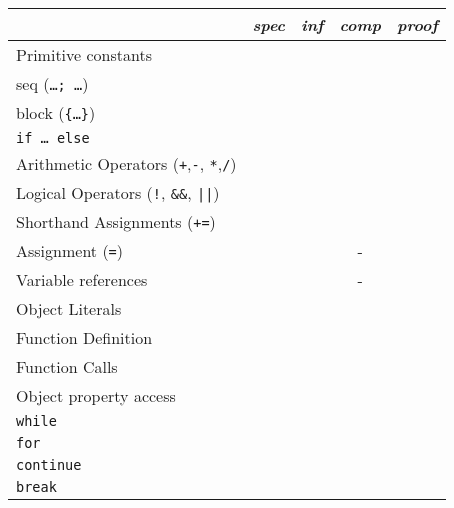 \documentclass{article}
\begin{document}
	\begin{table}[ht]
		\begin{tabular}{lcccc}
		                                  & \textit{spec} & \textit{inf} & \textit{comp} &  \textit{proof} \\ 
		\hline
		Primitive constants               & \checkmark{}  & \checkmark{} & \checkmark{}  &  \checkmark{}   \\
		seq (\texttt{\ldots; \ldots})     & \checkmark{}  & \checkmark{} & \checkmark{}  &  \checkmark{}   \\
		block (\texttt{\{\ldots\}})     & \checkmark{}  & \checkmark{} & \checkmark{}  &  \checkmark{}   \\
		\texttt{if \ldots~else}           & \checkmark{}  & \checkmark{} & \checkmark{}  &  \checkmark{}   \\
		Arithmetic Operators 
			(\texttt{+},\texttt{-},
			\texttt{*},\texttt{/})        & \checkmark{}  & \checkmark{} & \checkmark{}  &  \checkmark{}   \\
		Logical Operators 
			(\texttt{!}, \texttt{\&{}\&},
				 \texttt{||})             & \checkmark{}  & \checkmark{} & \checkmark{}  &  \checkmark{}   \\
		Shorthand Assignments 
			(\texttt{+=})                 & \checkmark{}  & \checkmark{} & \checkmark{}  &  \checkmark{}   \\
		Assignment (\texttt{=})           & \checkmark{}  & \checkmark{} & -             &  \checkmark{}   \\
		Variable references               & \checkmark{}  & \checkmark{} & -             &  \checkmark{}   \\
		Object Literals                   & \checkmark{}  & \checkmark{} & \checkmark{}  &                 \\
		Function Definition               & \checkmark{}  & \checkmark{} & \checkmark{}  &                 \\
		Function Calls 		              & \checkmark{}  & \checkmark{} &               &                 \\
		Object property access            & \checkmark{}  & \checkmark{} & 	             &                 \\
		\texttt{while}                    &               &              &               &                 \\
		\texttt{for}                      &               &              &               &                 \\
		\texttt{continue}                 &               &              &               &                 \\
		\texttt{break}                    &               &              &               &                 \\
		\end{tabular}
	\end{table}
\end{document}
